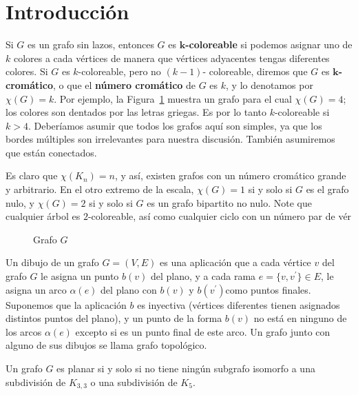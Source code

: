 \documentclass[3p,times,a4paper,twocolumn,authoryear]{elsarticle} %
\begin{document}
\tableofcontents

\section{Introducción}
Si $G$ es un grafo sin lazos, entonces $G$ es \textbf{$\bm{k}$-coloreable} si podemos asignar uno de $k$ colores a cada vértices de manera que vértices adyacentes tengas diferentes colores. Si $G$ es $k$-coloreable, pero no $(k-1)$- coloreable, diremos que $G$ es \textbf{$\bm{k}$-cromático}, o que el \textbf{número cromático} de $G$ es $k$, y lo denotamos por $\chi(G)=k$. Por ejemplo, la Figura~\ref{fig:1.1} muestra un grafo para el cual $\chi(G)=4$; los colores son dentados por las letras griegas. Es por lo tanto $k$-coloreable si $k>4$. Deberíamos asumir que todos los grafos aquí son simples, ya que los bordes múltiples son irrelevantes para nuestra discusión. También asumiremos que están conectados.

Es claro que $\chi(K_n)=n$, y así, existen grafos con un número cromático grande y arbitrario. En el otro extremo de la escala, $\chi(G)=1$ si y solo si $G$ es el grafo nulo, y $\chi(G)=2$ si y solo si $G$ es un grafo bipartito no nulo. Note que cualquier árbol es $2$-coloreable, así como cualquier ciclo con un número par de vér

\begin{figure}[H]
\centering
\scalebox{0.6}{}
\caption{Grafo $G$}\label{fig:1.1}
\end{figure}

\begin{definition}
Un dibujo de un grafo $G=(V,E)$ es una aplicación que a cada vértice $v$ del grafo $G$ le asigna un punto $b(v)$ del plano, y a cada rama $e=\{v,v^{\prime}\}\in E$, le asigna un arco $\alpha(e)$ del plano con $b(v)$ y $b(v^{\prime})$como puntos finales. Suponemos que la aplicación $b$ es inyectiva (vértices diferentes tienen asignados distintos puntos del plano), y un punto de la forma $b(v)$ no está en ninguno de los arcos $\alpha(e)$ excepto si es un punto final de este arco. Un grafo junto con alguno de sus dibujos se llama grafo topológico.
\end{definition}

\begin{theorem}
Un grafo $G$ es planar si y solo si no tiene ningún subgrafo isomorfo a una subdivisión de $K_{3,3}$ o una subdivisión de $K_5$.
\end{theorem}
\end{document}

